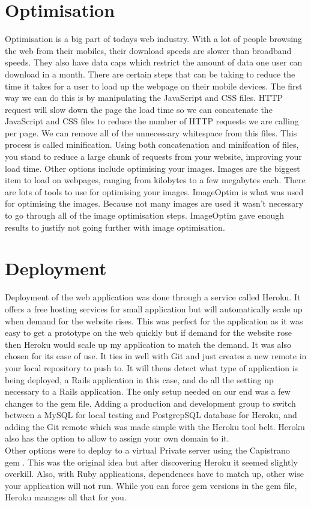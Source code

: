 \section{Optimisation}
Optimisation is a big part of todays web industry. With a lot of people browsing the web from their mobiles, their download speeds are slower than broadband speeds. They also have data caps which restrict the amount of data one user can download in a month. There are certain steps that can be taking to reduce the time it takes for a user to load up the webpage on their mobile devices. The first way we can do this is by manipulating the JavaScript and CSS files. HTTP request will slow down the page the load time so we can concatenate the JavaScript and CSS files to reduce the number of HTTP requests we are calling per page. We can remove all of the unnecessary whitespace from this files. This process is called minification. Using both concatenation and minifcation of files, you stand to reduce a large chunk of requests from your website, improving your load time. Other options include optimising your images. Images are the biggest item to load on webpages, ranging from kilobytes to a few megabytes each. There are lots of tools to use for optimising your images. ImageOptim \citep{imageoptim:2014} is what was used for optimising the images. Because not many images are used it wasn't necessary to go through all of the image optimisation steps. ImageOptim gave enough results to justify not going further with image optimisation.\\


\section{Deployment}
\label{sec:deployment}
Deployment of the web application was done through a service called Heroku. It offers a free hosting services for small application but will automatically scale up when demand for the website rises. This was perfect for the application as it was easy to get a prototype on the web quickly but if demand for the website rose then Heroku would scale up my application to match the demand. It was also chosen for its ease of use. It ties in well with Git and just creates a new remote in your local repository to push to. It will thens detect what type of application is being deployed, a Rails application in this case, and do all the setting up necessary to a Rails application. The only setup needed on our end was a few changes to the gem file. Adding a production and development group to switch between a MySQL \citep{mysql:1995} for local testing and PostgrepSQL \citep{postgres:1995} database for Heroku, and adding the Git remote which was made simple with the Heroku tool belt. Heroku also has the option to allow to assign your own domain to it.\\

Other options were to deploy to a virtual Private server using the Capistrano gem \citep{capistrano:2013}. This was the original idea but after discovering Heroku it seemed slightly overkill. Also, with Ruby applications, dependences have to match up, other wise your application will not run. While you can force gem versions in the gem file, Heroku manages all that for you.
